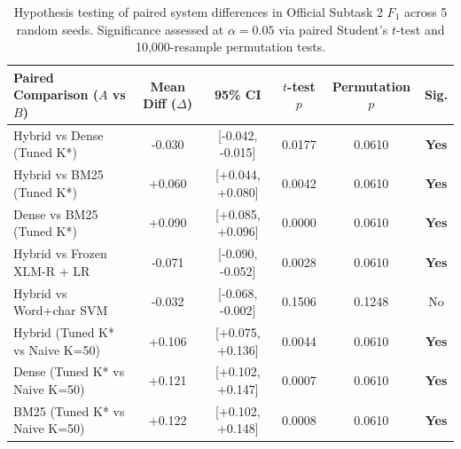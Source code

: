 \begin{table}[t]
\centering
\small
\begin{tabular}{lccccc}
\toprule
\textbf{Paired Comparison ($A$ vs $B$)} & \textbf{Mean Diff ($\Delta$)} & \textbf{95\% CI} & \textbf{$t$-test $p$} & \textbf{Permutation $p$} & \textbf{Sig.} \\
\midrule
Hybrid vs Dense (Tuned K*) & -0.030 & [-0.042, -0.015] & 0.0177 & 0.0610 & \textbf{Yes} \\
Hybrid vs BM25 (Tuned K*) & +0.060 & [+0.044, +0.080] & 0.0042 & 0.0610 & \textbf{Yes} \\
Dense vs BM25 (Tuned K*) & +0.090 & [+0.085, +0.096] & 0.0000 & 0.0610 & \textbf{Yes} \\
Hybrid vs Frozen XLM-R + LR & -0.071 & [-0.090, -0.052] & 0.0028 & 0.0610 & \textbf{Yes} \\
Hybrid vs Word+char SVM & -0.032 & [-0.068, -0.002] & 0.1506 & 0.1248 & No \\
Hybrid (Tuned K* vs Naive K=50) & +0.106 & [+0.075, +0.136] & 0.0044 & 0.0610 & \textbf{Yes} \\
Dense (Tuned K* vs Naive K=50) & +0.121 & [+0.102, +0.147] & 0.0007 & 0.0610 & \textbf{Yes} \\
BM25 (Tuned K* vs Naive K=50) & +0.122 & [+0.102, +0.148] & 0.0008 & 0.0610 & \textbf{Yes} \\
\bottomrule
\end{tabular}
\caption{Hypothesis testing of paired system differences in Official Subtask 2 $F_1$ across 5 random seeds. Significance assessed at $\alpha=0.05$ via paired Student's $t$-test and 10,000-resample permutation tests.}
\label{tab:paired_significance}
\end{table}